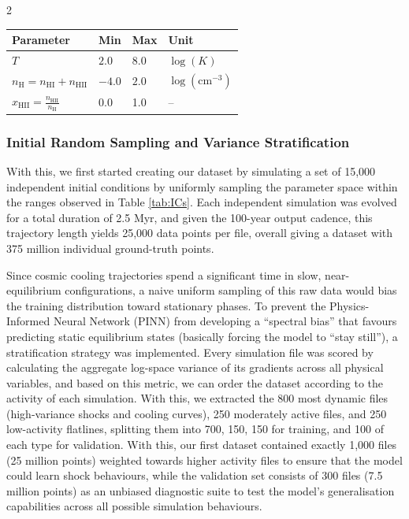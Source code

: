 \documentclass[10pt,a4paper]{article}
\begin{document}
\begin{multicols}{2}
\begin{center}
    \begin{tabular}{llll}
    \hline
    Parameter & Min & Max & Unit \\
    \hline
    $T$ & $2.0$ & $8.0$ & $\log(K)$ \\
    $n_{\text{H}} = n_{\text{HI}} + n_{\text{HII}} $ & $-4.0$ & $2.0$ & $\log\left(\text{cm}^{-3}\right)$ \\
    $x_{\text{HII}} = \frac{n_{\text{HII}}}{n_{\text{H}}}$ & 0.0 & 1.0 & -- \\
    \hline
    \end{tabular}
    \label{tab:ICs}
\end{center}

\subsubsection{Initial Random Sampling and Variance Stratification}
\label{sec:dataset1}

With this, we first started creating our dataset by simulating a set of 15,000 independent initial conditions by uniformly sampling the parameter space within the ranges observed in Table \ref{tab:ICs}. Each independent simulation was evolved for a total duration of 2.5 Myr, and given the 100-year output cadence, this trajectory length yields 25,000 data points per file, overall giving a dataset with 375 million individual ground-truth points.

Since cosmic cooling trajectories spend a significant time in slow, near-equilibrium configurations, a naive uniform sampling of this raw data would bias the training distribution toward stationary phases. To prevent the Physics-Informed Neural Network (PINN) from developing a ``spectral bias'' that favours predicting static equilibrium states (basically forcing the model to ``stay still''), a stratification strategy was implemented. Every simulation file was scored by calculating the aggregate log-space variance of its gradients across all physical variables, and based on this metric, we can order the dataset according to the activity of each simulation. With this, we extracted the 800 most dynamic files (high-variance shocks and cooling curves), 250 moderately active files, and 250 low-activity flatlines, splitting them into 700, 150, 150 for training, and 100 of each type for validation. With this, our first dataset contained exactly 1,000 files (25 million points) weighted towards higher activity files to ensure that the model could learn shock behaviours, while the validation set consists of 300 files (7.5 million points) as an unbiased diagnostic suite to test the model's generalisation capabilities across all possible simulation behaviours.


\end{multicols}
\end{document}
